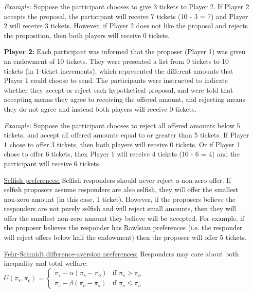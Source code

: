 \documentclass[12pt]{article}
\begin{document}
\textit{Example:} Suppose the participant chooses to give 3 tickets to Player 2. If Player 2 accepts the proposal, the participant will receive 7 tickets (10 - 3 = 7) and Player 2 will receive 3 tickets. However, if Player 2 does not like the proposal and rejects the proposition, then both players will receive 0 tickets.
 
\textbf{Player 2:} Each participant was informed that the proposer (Player 1) was given an endowment of 10 tickets. They were presented a list from 0 tickets to 10 tickets (in 1-ticket increments), which represented the different amounts that Player 1 could choose to send. The participants were instructed to indicate whether they accept or reject each hypothetical proposal, and were told that accepting means they agree to receiving the offered amount, and rejecting means they do not agree and instead both players will receive 0 tickets.

\textit{Example:} Suppose the participant chooses to reject all offered amounts below 5 tickets, and accept all offered amounts equal to or greater than 5 tickets. If Player 1 chose to offer 3 tickets, then both players will receive 0 tickets. Or if Player 1 chose to offer 6 tickets, then Player 1 will receive 4 tickets (10 - 6 = 4) and the participant will receive 6 tickets.

\underline{Selfish preferences:} Selfish responders should never reject a non-zero offer. If selfish proposers assume responders are also selfish, they will offer the smallest non-zero amount (in this case, 1 ticket). However, if the proposers believe the responders are not purely selfish and will reject small amounts, then they will offer the smallest non-zero amount they believe will be accepted. For example, if the proposer believes the responder has Rawlsian preferences (i.e. the responder will reject offers below half the endowment) then the proposer will offer 5 tickets.

\underline{Fehr-Schmidt difference-aversion preferences:} Responders may care about both inequality and total welfare:\\

$ U(\pi_{s}, \pi_{o})  = \begin{cases}
      \pi_{s} - \alpha(\pi_{s} - \pi_{o}) & \text{if }\pi_{s} > \pi_{o} \\
      \pi_{s} - \beta(\pi_{o} - \pi_{s}) & \text{if }\pi_{s} \leq \pi_{o}
    \end{cases}\, $ \\
\end{document}

